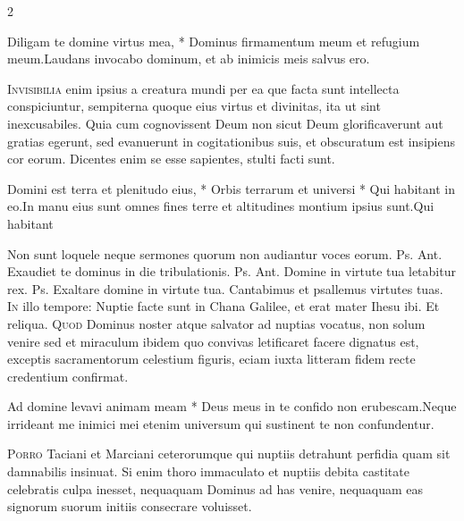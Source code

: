 \begin{multicols*}{2}
\begin{responsory}
{Diligam te domine virtus mea, * Dominus firmamentum meum et refugium meum.}{Laudans invocabo dominum, et ab inimicis meis salvus ero.}
\end{responsory}%
\lettrine[lines=2]{\zallmancaps \color{Blue} I}{nvisibilia} enim ipsius a creatura mundi per ea que facta sunt intellecta conspiciuntur, sempiterna quoque eius virtus et divinitas, ita ut sint inexcusabiles. Quia cum cognovissent Deum non sicut Deum glorificaverunt aut gratias egerunt, sed evanuerunt in cogitationibus suis, et obscuratum est insipiens cor eorum. Dicentes enim se esse sapientes, stulti facti sunt.
\begin{responsory-final}
{Domini est terra et plenitudo eius, * Orbis terrarum et universi * Qui habitant in eo.}{In manu eius sunt omnes fines terre et altitudines montium ipsius sunt.}{Qui habitant}
\end{responsory-final}%
 Non sunt loquele neque sermones quorum non audiantur voces eorum. {\color{Red} Ps.}  {\color{Red} Ant.} Exaudiet te dominus in die tribulationis. {\color{Red} Ps.}  {\color{Red} Ant.} Domine in virtute tua letabitur rex. {\color{Red} Ps.}  \V Exaltare domine in virtute tua. \R Cantabimus et psallemus virtutes tuas.
\lettrine[lines=2]{\zallmancaps \color{Red} I}{n} illo tempore: Nuptie facte sunt in Chana Galilee, et erat mater Ihesu ibi. Et reliqua.
 \grecross
\lettrine[lines=2]{\zallmancaps \color{Blue} Q}{uod} Dominus noster atque salvator ad nuptias vocatus, non solum venire sed et miraculum ibidem quo convivas
letificaret facere dignatus est, exceptis sacramentorum celestium figuris, eciam iuxta litteram fidem recte credentium confirmat.
\begin{responsory}
{Ad domine levavi animam meam * Deus meus in te confido non erubescam.}{Neque irrideant me inimici mei etenim universum qui sustinent te non confundentur.}
\end{responsory}%
\lettrine[lines=2]{\zallmancaps \color{Red} P}{orro} Taciani et Marciani ceterorumque qui nuptiis detrahunt perfidia quam sit damnabilis insinuat. Si enim thoro immaculato et nuptiis debita castitate celebratis culpa inesset, nequaquam Dominus ad has venire, nequaquam eas signorum suorum initiis consecrare voluisset.

\end{multicols*}
